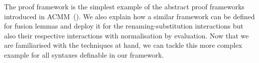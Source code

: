 The  proof framework is the simplest example of the abstract
proof frameworks introduced in ACMM~(\citeyear{allais2017type}). We also
explain how a similar framework can be defined
for fusion lemmas and deploy it for the renaming-substitution interactions
but also their respective interactions with normalisation by evaluation.
Now that we are familiarised with the techniques at hand, we can tackle
this more complex example for all syntaxes definable in our framework.
